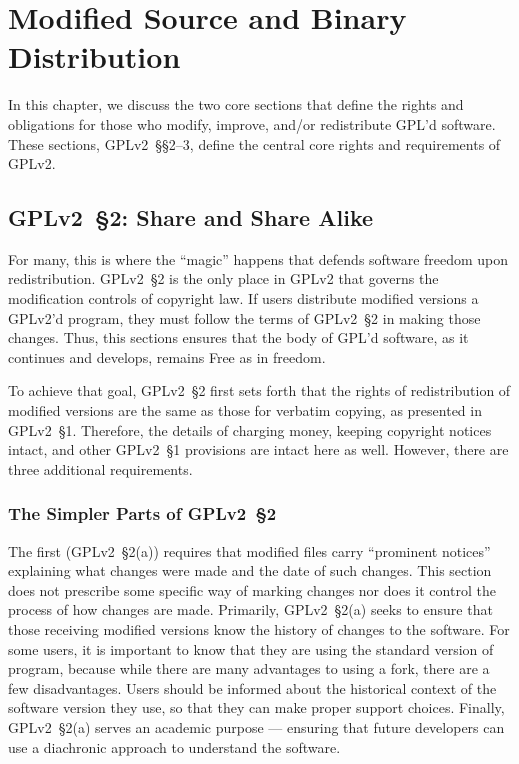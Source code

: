 \chapter{Modified Source and Binary Distribution}
\label{source-and-binary}

In this chapter, we discuss the two core sections that define the rights
and obligations for those who modify, improve, and/or redistribute GPL'd
software. These sections, GPLv2~\S\S2--3, define the central core rights and
requirements of GPLv2\@.

\section{GPLv2~\S2: Share and Share Alike}
\label{GPLv2s2}

For many, this is where the ``magic'' happens that defends software
freedom upon redistribution.  GPLv2~\S2 is the only place in GPLv2
that governs the modification controls of copyright law.  If users
distribute modified versions a GPLv2'd program, they must follow the terms of GPLv2~\S2 in making
those changes.  Thus, this sections ensures that the body of GPL'd software, as it
continues and develops, remains Free as in freedom.

To achieve that goal, GPLv2~\S2 first sets forth that the rights of
redistribution of modified versions are the same as those for verbatim
copying, as presented in GPLv2~\S1.  Therefore, the details of charging money,
keeping copyright notices intact, and other GPLv2~\S1 provisions are intact
here as well.  However, there are three additional requirements.

\subsection{The Simpler Parts of GPLv2~\S2}

The first (GPLv2~\S2(a)) requires that modified files carry ``prominent
notices'' explaining what changes were made and the date of such
changes. This section does not prescribe some specific way of
marking changes nor does it control the process of how changes are made.
Primarily, GPLv2~\S2(a) seeks to ensure that those receiving modified
versions know the history of changes to the software.  For some users,
it is important to know that they are using the standard version of
program, because while there are many advantages to using a fork,
there are a few disadvantages.  Users should be informed about the
historical context of the software version they use, so that they can
make proper support choices.  Finally, GPLv2~\S2(a) serves an academic
purpose --- ensuring that future developers can use a diachronic
approach to understand the software.

